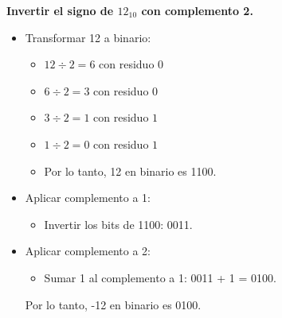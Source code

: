 \documentclass{templateNote}
\begin{document}
\begin{tcolorbox}[colback=blue!10, colframe=blue!80!black, title={Ejemplo}]
    \textbf{Invertir el signo de $12_{10}$ con complemento 2.}
    \begin{itemize}
        \item Transformar 12 a binario:
        \begin{itemize}
            \item $12 \div 2 = 6$ con residuo $0$
            \item $6 \div 2 = 3$ con residuo $0$
            \item $3 \div 2 = 1$ con residuo $1$
            \item $1 \div 2 = 0$ con residuo $1$
            \item Por lo tanto, 12 en binario es 1100.
        \end{itemize}
        \item Aplicar complemento a 1:
        \begin{itemize}
            \item Invertir los bits de 1100: 0011.
        \end{itemize}
        \item Aplicar complemento a 2:
        \begin{itemize}
            \item Sumar 1 al complemento a 1: 0011 + 1 = 0100.
        \end{itemize}
        Por lo tanto, -12 en binario es 0100.
    \end{itemize}
\end{tcolorbox}
\end{document}
